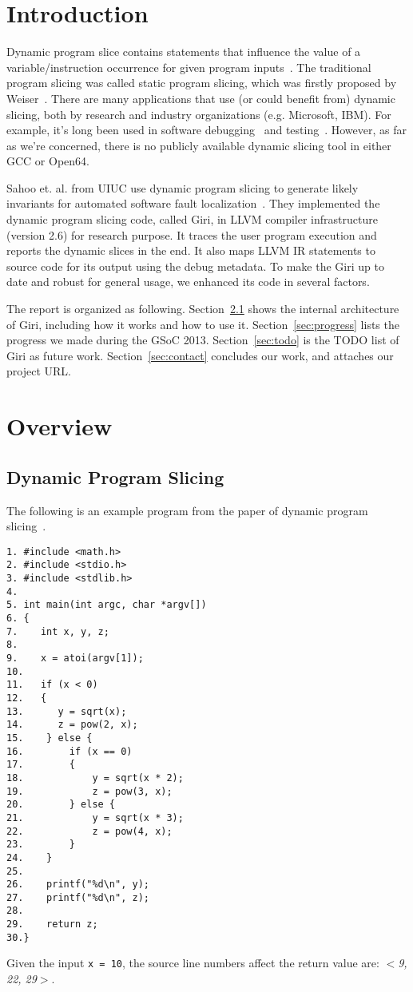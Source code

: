 \documentclass[DIV=calc, paper=a4, fontsize=11pt, twocolumn]{scrartcl}
\begin{document}
\section{Introduction}
Dynamic program slice contains statements that influence the value of a variable/instruction occurrence for given program inputs~\cite{agrawal1990dynamic}.
The traditional program slicing was called static program slicing, which was firstly proposed by Weiser~\cite{weiser}.
There are many applications that use (or could benefit from) dynamic slicing, both by research and industry organizations (e.g. Microsoft, IBM).
For example, it's long been used in software debugging~\cite{1993debugging,1999efficient} and testing~\cite{1993incremental}.
However, as far as we're concerned, there is no publicly available dynamic slicing tool in either GCC or Open64.

Sahoo et. al. from UIUC use dynamic program slicing to generate likely invariants for automated software fault localization~\cite{sahoo2013asplos}.
They implemented the dynamic program slicing code, called Giri, in LLVM compiler infrastructure (version 2.6) for research purpose.
It traces the user program execution and reports the dynamic slices in the end.
It also maps LLVM IR statements to source code for its output using the debug metadata.
To make the Giri up to date and robust for general usage,
we enhanced its code in several factors.

The report is organized as following.
Section~\ref{sec:overview} shows the internal architecture of Giri, including how it works and how to use it.
Section~\ref{sec:progress} lists the progress we made during the GSoC 2013.
Section~\ref{sec:todo} is the TODO list of Giri as future work.
Section~\ref{sec:contact} concludes our work, and attaches our project URL.

\section{Overview}
\subsection{Dynamic Program Slicing}
\label{sec:overview}
The following is an example program from the paper of dynamic program slicing~\cite{agrawal1990dynamic}.
\begin{verbatim}
1. #include <math.h>
2. #include <stdio.h>
3. #include <stdlib.h>
4.
5. int main(int argc, char *argv[])
6. {
7.    int x, y, z;
8.
9.    x = atoi(argv[1]);
10.
11.   if (x < 0)
12.   {
13.      y = sqrt(x);
14.      z = pow(2, x);
15.    } else {
16.        if (x == 0)
17.        {
18.            y = sqrt(x * 2);
19.            z = pow(3, x);
20.        } else {
21.            y = sqrt(x * 3);
22.            z = pow(4, x);
23.        }
24.    }
25.
26.    printf("%d\n", y);
27.    printf("%d\n", z);
28.
29.    return z;
30.}
\end{verbatim}
Given the input \texttt{x = 10}, the source line numbers affect the return value are: $<$\emph{9, 22, 29}$>$.
\end{document}

